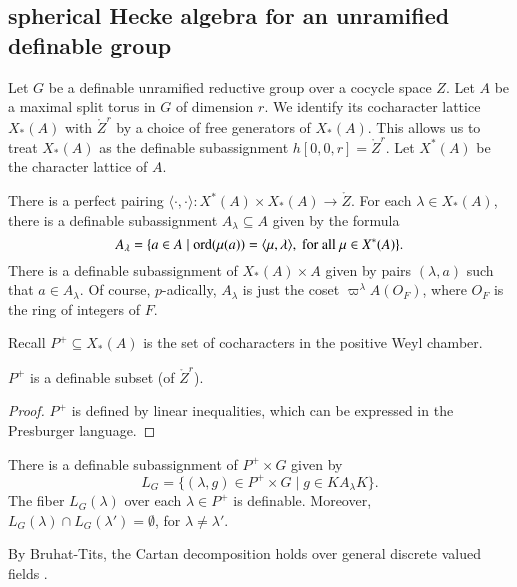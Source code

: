 \subsection{spherical Hecke algebra 
for an unramified definable group}

Let $G$ be a definable unramified reductive group over a cocycle space
$Z$.  Let $A$ be a maximal split torus in $G$ of dimension $r$.  We
identify its cocharacter lattice  $X_*(A)$ with $\ring{Z}^r$ by a
choice of free generators of $X_*(A)$.  This allows us to treat
$X_*(A)$ as the definable subassignment $h[0,0,r] = \ring{Z}^r$.  Let
$X^*(A)$ be the character lattice  of $A$.

There is a perfect pairing $\langle\cdot,\cdot\rangle:X^*(A)\times
X_*(A) \to \ring{Z}$.  For each $\lambda\in X_*(A)$, there is a
definable subassignment $A_\lambda \subseteq A$ given by the formula
\begin{equation}\label{eqn:alambda}
A_\lambda = \{ a \in A \mid {\operatorname{ord}}(\mu(a)) 
= \langle{\mu,\lambda}\rangle,\text{ for all } \mu\in X^*(A) \}.
\end{equation}
There is a definable subassignment of $X_*(A)\times A$ given by pairs
$(\lambda,a)$ such that $a\in A_\lambda$.  Of course, $p$-adically,
$A_\lambda$ is just the coset $\varpi^\lambda A(O_F)$, where $O_F$ is
the ring of integers of $F$.

Recall $P^+\subseteq X_*(A)$ is the set of cocharacters in the positive
Weyl chamber.

\begin{lemma} 
  $P^+$ is a definable subset (of $\ring{Z}^r$).
\end{lemma}

\begin{proof} 
  $P^+$ is defined by linear inequalities, which can be expressed in
  the Presburger language.
\end{proof}

\begin{lemma} \label{lemma:cartan}
  There is a definable subassignment of $P^+\times G$ given by 
\[
L_G = \{(\lambda,g)\in P^+\times G \mid g \in K A_\lambda K \}.
\]
The fiber $L_G(\lambda)$ over each $\lambda\in P^+$ is definable.
Moreover, $L_G(\lambda)\cap L_G(\lambda') = \emptyset$, for
$\lambda\ne \lambda'$.
\end{lemma}

By Bruhat-Tits, the Cartan decomposition holds over general discrete valued
fields \cite[4.4.3]{bruhat1972groupes}.

